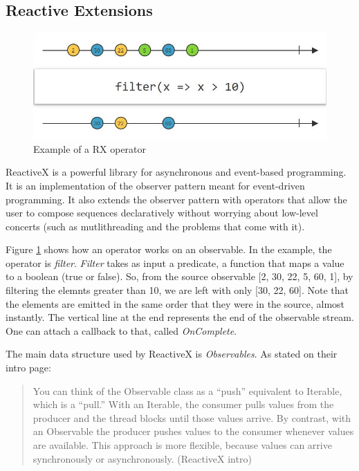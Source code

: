 \documentclass[12pt,a4paper,twoside]{report}
\begin{document}
\subsection{Reactive Extensions}

\begin{figure}[h]
  \centering
  \includegraphics[width=0.95\linewidth]{img/RX_filter.JPG}
  \caption[]{Example of a RX operator \footnotemark}
  \label{fig:rx_filter}
\end{figure}
  
ReactiveX is a powerful library for asynchronous and event-based programming. It is an implementation of the observer pattern meant for event-driven programming. It also extends the observer pattern with operators that allow the user to compose sequences declaratively without worrying about low-level concerts (such as mutlithreading and the problems that come with it).

Figure \ref{fig:rx_filter} shows how an operator works on an observable. In the example, the operator is \textit{filter}. \textit{Filter} takes as input a predicate, a function that maps a value to a boolean (true or false). So, from the source observable [2, 30, 22, 5, 60, 1], by filtering the elemnts greater than 10, we are left with only [30, 22, 60]. Note that the elements are emitted in the same order that they were in the source, almost instantly. The vertical line at the end represents the end of the observable stream. One can attach a callback to that, called \textit{OnComplete}.


The main data structure used by ReactiveX is \textit{Observables}. As stated on their intro page:

\begin{quote}
  You can think of the Observable class as a “push” equivalent to Iterable, which is a “pull.” With an Iterable, the consumer pulls values from the producer and the thread blocks until those values arrive. By contrast, with an Observable the producer pushes values to the consumer whenever values are available. This approach is more flexible, because values can arrive synchronously or asynchronously. (ReactiveX intro)
\end{quote}
\end{document}
